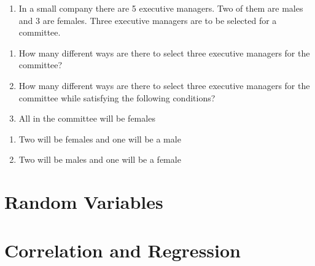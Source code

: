 \documentclass[]{book}
\providecommand{\tightlist}{%
  \setlength{\itemsep}{0pt}\setlength{\parskip}{0pt}}
\begin{document}
\begin{enumerate}
\def\labelenumi{\arabic{enumi}.}
\setcounter{enumi}{2}
\tightlist
\item
  In a small company there are 5 executive managers. Two of them are males and 3 are females. Three executive managers are to be selected for a committee.
\end{enumerate}

\begin{enumerate}
\def\labelenumi{\alph{enumi}.}
\tightlist
\item
  How many different ways are there to select three executive managers for the committee?
\item
  How many different ways are there to select three executive managers for the committee while satisfying the following conditions?
\item
  All in the committee will be females
\end{enumerate}

\begin{enumerate}
\def\labelenumi{\roman{enumi}.}
\setcounter{enumi}{1}
\tightlist
\item
  Two will be females and one will be a male
\item
  Two will be males and one will be a female
\end{enumerate}

\hypertarget{random-variables}{%
\chapter{Random Variables}\label{random-variables}}

\hypertarget{correlation-and-regression}{%
\chapter{Correlation and Regression}\label{correlation-and-regression}}


\end{document}
